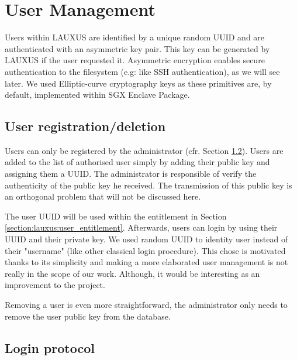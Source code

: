 \documentclass[../main.tex]{subfiles}
\begin{document}
\section{User Management}
\label{section:lauxus:user_mgnmt}

\par Users within LAUXUS are identified by a unique random UUID and are authenticated with an asymmetric key pair. This key can be generated by LAUXUS if the user requested it. Asymmetric encryption enables secure authentication to the filesystem (e.g: like SSH authentication), as we will see later. We used Elliptic-curve cryptography keys as these primitives are, by default, implemented within SGX Enclave Package.


\subsection{User registration/deletion}
\label{section:lauxus:user_registration/deletion}

\par Users can only be registered by the administrator (cfr. Section \ref{section:lauxus:login}). Users are added to the list of authorised user simply by adding their public key and assigning them a UUID. The administrator is responsible of verify the authenticity of the public key he received. The transmission of this public key is an orthogonal problem that will not be discussed here.
\par The user UUID will be used within the entitlement in Section \ref{section:lauxus:user_entitlement}. Afterwards, users can login by using their UUID and their private key. We used random UUID to identity user instead of their "username" (like other classical login procedure). This chose is motivated thanks to its simplicity and making a more elaborated user management is not really in the scope of our work. Although, it would be interesting as an improvement to the project.
\par Removing a user is even more straightforward, the administrator only needs to remove the user public key from the database.


\subsection{Login protocol}
\label{section:lauxus:login}
\end{document}
